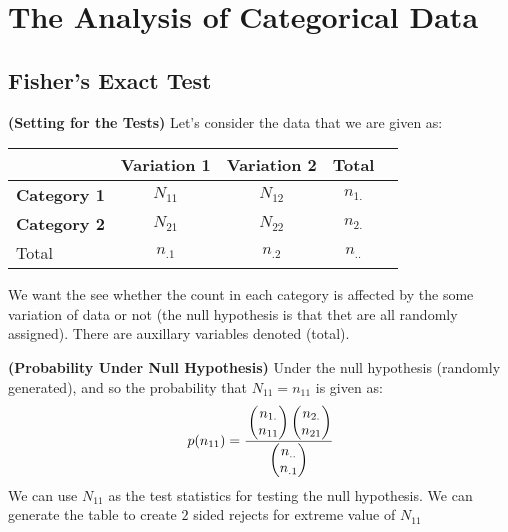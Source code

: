 \section{The Analysis of Categorical Data}

\subsection{Fisher's Exact Test}

\begin{remark}{\textbf{(Setting for the Tests)}}
    Let's consider the data that we are given as:
    \begin{table}[!h]
    \centering
    \begin{tabular}{lcccc}
        \toprule
        \textbf{}     & \textbf{Variation 1} & \textbf{Variation 2} & Total  \\
        \midrule
        \textbf{Category 1} & $N_{11}$ & $N_{12}$ & $n_{1.}$ \\
        \textbf{Category 2} & $N_{21}$ & $N_{22}$ & $n_{2.}$ \\
        Total & $n_{.1}$ & $n_{.2}$ & $n_{..}$ \\
        \bottomrule
    \end{tabular}
    \end{table}
    We want the see whether the count in each category is affected by the some variation of data or not (the null hypothesis is that thet are all randomly assigned). There are auxillary variables denoted (total). 
\end{remark}

\begin{remark}{\textbf{(Probability Under Null Hypothesis)}}
    Under the null hypothesis (randomly generated), and so the probability that $N_{11} = n_{11}$ is given as:
    \begin{equation*}
        p(n_{11}) = \cfrac{\begin{pmatrix}
            n_{1.} \\ n_{11}
        \end{pmatrix}\begin{pmatrix}
            n_{2.} \\ n_{21}
        \end{pmatrix}}{\begin{pmatrix}
            n_{..} \\ n_{.1}
        \end{pmatrix}}
    \end{equation*}
    We can use $N_{11}$ as the test statistics for testing the null hypothesis. We can generate the table to create $2$ sided rejects for extreme value of $N_{11}$
\end{remark}

